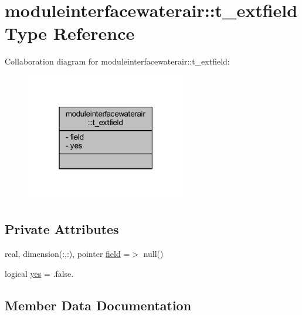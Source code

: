 \hypertarget{structmoduleinterfacewaterair_1_1t__extfield}{}\section{moduleinterfacewaterair\+:\+:t\+\_\+extfield Type Reference}
\label{structmoduleinterfacewaterair_1_1t__extfield}


Collaboration diagram for moduleinterfacewaterair\+:\+:t\+\_\+extfield\+:\nopagebreak
\begin{figure}[H]
\begin{center}
\leavevmode
\includegraphics[width=199pt]{structmoduleinterfacewaterair_1_1t__extfield__coll__graph}
\end{center}
\end{figure}
\subsection*{Private Attributes}
\begin{DoxyCompactItemize}
\item 
real, dimension(\+:,\+:), pointer \mbox{\hyperlink{structmoduleinterfacewaterair_1_1t__extfield_a568b06f22d272ec30e2670ba04fb0772}{field}} =$>$ null()
\item 
logical \mbox{\hyperlink{structmoduleinterfacewaterair_1_1t__extfield_aa407514dfdccc7f96550c090722397ac}{yes}} = .false.
\end{DoxyCompactItemize}


\subsection{Member Data Documentation}
\mbox{\label{structmoduleinterfacewaterair_1_1t__extfield_a568b06f22d272ec30e2670ba04fb0772}} 
